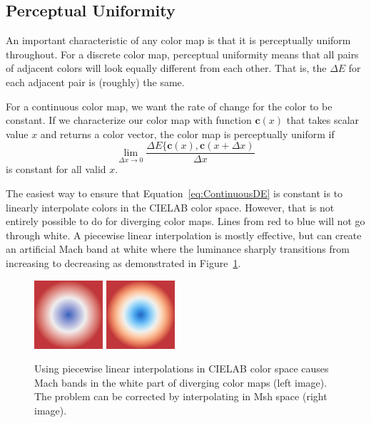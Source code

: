 \documentclass[twocolumn]{article}
\newcommand{\Lab}{CIELAB\xspace}
\newcommand{\Msh}{Msh\xspace}
\newcommand{\DeltaE}{\ensuremath{\Delta{}E}\xspace}
\newcommand*{\cvec}[1]{\mathbf{#1}}
\begin{document}
\subsection{Perceptual Uniformity}
\label{sec:PerceptualUniformity}

An important characteristic of any color map is that it is perceptually
uniform throughout.  For a discrete color map, perceptual uniformity means
that all pairs of adjacent colors will look equally different from each
other.  That is, the \DeltaE for each adjacent pair is (roughly) the same.

For a continuous color map, we want the rate of change for the color to be
constant.  If we characterize our color map with function $\cvec{c}(x)$
that takes scalar value $x$ and returns a color vector, the color map is
perceptually uniform if
\begin{equation}
  \lim_{\Delta{}x \rightarrow 0}{
    \frac{\DeltaE\{\cvec{c}(x),\cvec{c}(x+\Delta{x})}{\Delta{}x} }
  \label{eq:ContinuousDE}
\end{equation}
is constant for all valid $x$.

The easiest way to ensure that Equation~\ref{eq:ContinuousDE} is constant
is to linearly interpolate colors in the \Lab color space.  However, that
is not entirely possible to do for diverging color maps.  Lines from red to
blue will not go through white.  A piecewise linear interpolation is mostly
effective, but can create an artificial Mach band at white where the
luminance sharply transitions from increasing to decreasing as demonstrated
in Figure~\ref{fig:LinearMachBands}.

\begin{figure}
  \centering
  \includegraphics[width=1in]{images/Cool2WarmLabRadial}
  \qquad
  \includegraphics[width=1in]{images/Cool2WarmRadial}
  \caption{Using piecewise linear interpolations in \Lab color space causes
    Mach bands in the white part of diverging color maps (left image).  The
    problem can be corrected by interpolating in \Msh space (right image).}
  \label{fig:LinearMachBands}
\end{figure}
\end{document}
